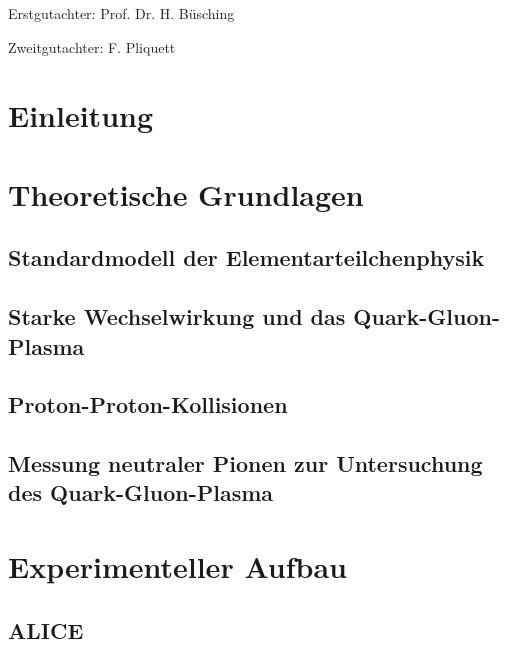 \documentclass[11pt]{article}
\author{Marvin Hemmer}
\renewcommand{\,}{,\!} %
\begin{document}
\begin{titlepage}
\begin{center}

\end{center}
\end{titlepage}
\newpage
\thispagestyle{empty}
\vspace*{\fill}
Erstgutachter: Prof. Dr. H. Büsching

Zweitgutachter: F. Pliquett
\newpage
\clearpage
\setcounter{page}{1}
\tableofcontents
\newpage

\section*{Einleitung}
\newpage
\section{Theoretische Grundlagen} \label{s1}
\subsection{Standardmodell der Elementarteilchenphysik} \label{s1s1}

\subsection{Starke Wechselwirkung und das Quark-Gluon-Plasma} \label{s1s2}

\subsection{Proton-Proton-Kollisionen}
\label{s1s3}

\subsection{Messung neutraler Pionen zur Untersuchung des Quark-Gluon-Plasma} \label{s1s4}

\newpage

\section{Experimenteller Aufbau} \label{s2}

\subsection{ALICE} \label{s2s1}

\end{document}
